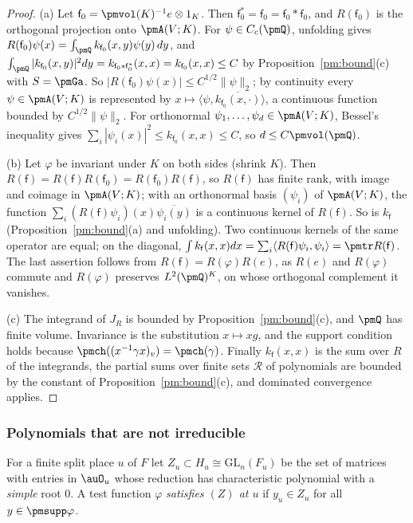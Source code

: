 \documentclass[10pt]{amsart}
\theoremstyle{definition}
\theoremstyle{remark}
\providecommand{\auGL}{\mathrm{GL}}
\providecommand{\aubar}[1]{\overline{#1}}
\begin{document}
\begin{proof}
(a) Let $\mathsf f_0=\pmvol(K)^{-1}e\otimes1_K$. Then $\mathsf f_0^*=\mathsf f_0=\mathsf f_0*\mathsf f_0$, and $R(\mathsf f_0)$ is the orthogonal
projection onto $\pmA(V;K)$. For $\psi\in C_c(\pmQ)$, unfolding gives $R(\mathsf f_0)\psi(x)=\int_{\pmQ}
k_{\mathsf f_0}(x,y)\psi(y)\,dy$, and $\int_{\pmQ}|k_{\mathsf f_0}(x,y)|^2dy=k_{\mathsf f_0*\mathsf f_0^*}(x,x)=k_{\mathsf f_0}(x,x)\le C$ by
Proposition~\ref{pm:bound}(c) with $S=\pmGa$. So $|R(\mathsf f_0)\psi(x)|\le C^{1/2}\|\psi\|_2$; by
continuity every $\psi\in\pmA(V;K)$ is represented by $x\mapsto\langle\psi,\aubar{k_{\mathsf f_0}(x,\cdot)}
\rangle$, a continuous function bounded by $C^{1/2}\|\psi\|_2$. For orthonormal $\psi_1,\dots,\psi_d
\in\pmA(V;K)$, Bessel's inequality gives $\sum_i|\psi_i(x)|^2\le k_{\mathsf f_0}(x,x)\le C$, so
$d\le C\pmvol(\pmQ)$.

(b) Let $\varphi$ be invariant under $K$ on both sides (shrink $K$). Then $R(\mathsf f)=R(\mathsf f)R(\mathsf f_0)=R(\mathsf f_0)
R(\mathsf f)$, so $R(\mathsf f)$ has finite rank, with image and coimage in $\pmA(V;K)$; with an orthonormal
basis $(\psi_i)$ of $\pmA(V;K)$, the function $\sum_i(R(\mathsf f)\psi_i)(x)\aubar{\psi_i(y)}$ is a
continuous kernel of $R(\mathsf f)$. So is $k_{\mathsf f}$ (Proposition~\ref{pm:bound}(a) and unfolding). Two
continuous kernels of the same operator are equal; on the diagonal, $\int k_{\mathsf f}(x,x)dx=\sum_i\langle
R(\mathsf f)\psi_i,\psi_i\rangle=\pmtr R(\mathsf f)$. The last assertion follows from $R(\mathsf f)=R(\varphi)R(e)$, as
$R(e)$ and $R(\varphi)$ commute and $R(\varphi)$ preserves $L^2(\pmQ)^K$, on whose orthogonal complement
it vanishes.

(c) The integrand of $J_R$ is bounded by Proposition~\ref{pm:bound}(c), and $\pmQ$ has finite
volume. Invariance is the substitution $x\mapsto xg$, and the support condition holds because
$\pmch((x^{-1}\gamma x)_v)=\pmch(\gamma)$. Finally $k_{\mathsf f}(x,x)$ is the sum over $R$ of the integrands,
the partial sums over finite sets $\mathcal R$ of polynomials are bounded by the constant of
Proposition~\ref{pm:bound}(c), and dominated convergence applies.
\end{proof}

\subsubsection{Polynomials that are not irreducible}\label{pm:ss-red}

For a finite split place $u$ of $F$ let $Z_u\subset H_u\cong\auGL_n(F_u)$ be the set of matrices
with entries in $\auO_u$ whose reduction has characteristic polynomial with a \emph{simple} root
$0$. A test function $\varphi$ \emph{satisfies $(Z)$ at $u$} if $y_u\in Z_u$ for all
$y\in\pmsupp\varphi$.
\end{document}
